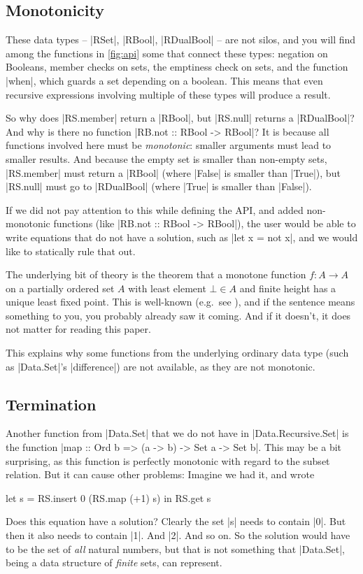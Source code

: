 \documentclass[manuscript,screen,acmsmall,nonacm]{acmart}
\begin{document}
\subsection{Monotonicity}\label{sec:monotonicity}

These data types -- |RSet|, |RBool|, |RDualBool| -- are not silos, and you will find among the functions in \cref{fig:api} some that connect these types: negation on Booleans, member checks on sets, the emptiness check on sets, and the function |when|, which guards a set depending on a boolean.
This means that even recursive expressions involving multiple of these types will produce a result.

So why does |RS.member| return a |RBool|, but |RS.null| returns a |RDualBool|? And why is there no function |RB.not :: RBool -> RBool|? It is because all functions involved here must be \emph{monotonic}: smaller arguments must lead to smaller results. And because the empty set is smaller than non-empty sets, |RS.member| must return a |RBool| (where |False| is smaller than |True|), but |RS.null| must go to |RDualBool| (where |True| is smaller than |False|).

If we did not pay attention to this while defining the API, and added non-monotonic functions (like |RB.not :: RBool -> RBool|), the user would be  able to write equations that do not have a solution, such as
|let x = not x|,
and we would like to statically rule that out.

The underlying bit of theory is the theorem that a monotone function $f : A \to A$ on a partially ordered set $A$ with least element $\bot \in A$ and finite height has a unique least fixed point. This is well-known (e.g.\ see \citep{lazyleast}), and if the sentence means something to you, you probably already saw it coming. And if it doesn't, it does not matter for reading this paper.

This explains why some functions from the underlying ordinary data type (such as |Data.Set|'s |difference|) are not available, as they are not monotonic.

\subsection{Termination}

Another function from |Data.Set| that we do not have in |Data.Recursive.Set| is the function |map :: Ord b => (a -> b) -> Set a -> Set b|. This may be a bit surprising, as this function is perfectly monotonic with regard to the subset relation. But it can cause other problems: Imagine we had it, and wrote
\begin{code}
let s = RS.insert 0 (RS.map (+1) s) in RS.get s
\end{code}
Does this equation have a solution? Clearly the set |s| needs to contain |0|. But then it also needs to contain |1|. And |2|. And so on. So the solution would have to be the set of \emph{all} natural numbers, but that is not something that |Data.Set|, being a data structure of \emph{finite} sets, can represent.
\end{document}
